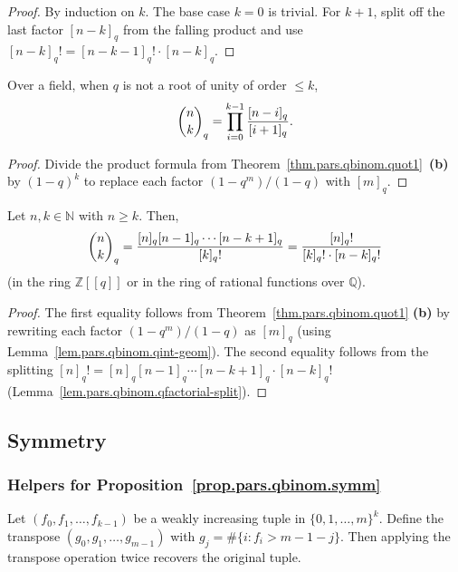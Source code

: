 \begin{proof}
\leanok
By induction on $k$. The base case $k=0$ is trivial. For $k+1$, split off
the last factor $[n-k]_q$ from the falling product and use
$[n-k]_q! = [n-k-1]_q! \cdot [n-k]_q$.
\end{proof}

\begin{lemma}
\label{lem.pars.qbinom.qint-prod-quot}
\leanhelper
\leanok
Over a field, when $q$ is not a root of unity of order $\le k$,
\[
\dbinom{n}{k}_q = \prod_{i=0}^{k-1} \frac{[n-i]_q}{[i+1]_q}.
\]
\end{lemma}

\begin{proof}
\leanok
Divide the product formula from Theorem~\ref{thm.pars.qbinom.quot1}~\textbf{(b)}
by $(1-q)^k$ to replace each factor $(1-q^m)/(1-q)$ with $[m]_q$.
\end{proof}

\begin{theorem}
\label{thm.pars.qbinom.quot2}
\leantarget
\leanok
Let $n,k\in\mathbb{N}$ with $n\geq k$. Then,
\[
\dbinom{n}{k}_{q}=\dfrac{[n]_{q}[n-1]_{q}
\cdots[n-k+1]_{q}}{[k]_{q}!}=\dfrac{[n]_{q}!}{[k]_{q}!\cdot[n-k]_{q}!}
\]
(in the ring $\mathbb{Z}[[q]]$ or in the ring of
rational functions over $\mathbb{Q}$).
\end{theorem}

\begin{proof}
The first equality follows from Theorem~\ref{thm.pars.qbinom.quot1}
\textbf{(b)} by rewriting each factor $(1-q^m)/(1-q)$ as $[m]_q$
(using Lemma~\ref{lem.pars.qbinom.qint-geom}).
The second equality follows from the splitting
$[n]_q! = [n]_q[n{-}1]_q\cdots[n{-}k{+}1]_q \cdot [n{-}k]_q!$
(Lemma~\ref{lem.pars.qbinom.qfactorial-split}).
\end{proof}

\subsection{Symmetry}

\subsubsection{Helpers for Proposition~\ref{prop.pars.qbinom.symm}}

\begin{lemma}
\label{lem.pars.qbinom.transpose-monotone-involutive}
\leanhelper
\leanok
Let $(f_0, f_1, \ldots, f_{k-1})$ be a weakly increasing tuple in $\{0,1,\ldots,m\}^k$. Define
the transpose $(g_0, g_1, \ldots, g_{m-1})$ with $g_j = \#\{i : f_i > m{-}1{-}j\}$.
Then applying the transpose operation
twice recovers the original tuple.
\end{lemma}

